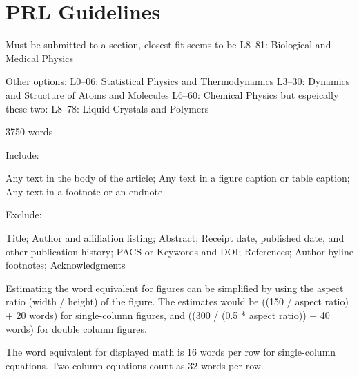 \documentclass[%
 reprint,
superscriptaddress,
showpacs,preprintnumbers,
 amsmath,amssymb,
 aps,
 prl,
]{revtex4-1}
\begin{document}
\section{PRL Guidelines}

Must be submitted to a section, closest fit seems to be
L8--81: Biological and Medical Physics

Other options:
L0--06: Statistical Physics and Thermodynamics
L3--30: Dynamics and Structure of Atoms and Molecules
L6--60: Chemical Physics
but espeically these two:
L8--78: Liquid Crystals and Polymers


3750 words

Include:

Any text in the body of the article;
Any text in a figure caption or table caption;
Any text in a footnote or an endnote

Exclude:

Title;
Author and affiliation listing;
Abstract;
Receipt date, published date, and other publication history;
PACS or Keywords and DOI;\@
References;
Author byline footnotes;
Acknowledgments

Estimating the word equivalent for figures can be simplified by using the aspect
ratio (width / height) of the figure. The estimates would be ((150 / aspect
ratio) + 20 words) for single-column figures, and ((300 / (0.5 * aspect ratio))
+ 40 words) for double column figures.

The word equivalent for displayed math is 16 words per row for single-column
equations. Two-column equations count as 32 words per row.



\end{document}

